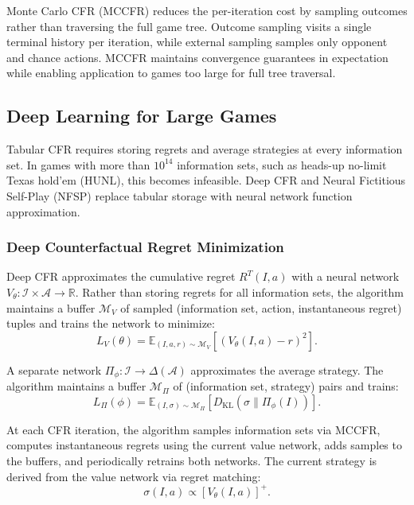 Monte Carlo CFR (MCCFR) \citep{lanctot2009monte} reduces the per-iteration cost by sampling outcomes rather than traversing the full game tree. Outcome sampling visits a single terminal history per iteration, while external sampling samples only opponent and chance actions. MCCFR maintains convergence guarantees in expectation while enabling application to games too large for full tree traversal.

\subsection{Deep Learning for Large Games}

Tabular CFR requires storing regrets and average strategies at every information set. In games with more than $10^{14}$ information sets, such as heads-up no-limit Texas hold'em (HUNL), this becomes infeasible. Deep CFR \citep{Brown2019} and Neural Fictitious Self-Play (NFSP) \citep{heinrich2016deep} replace tabular storage with neural network function approximation.

\subsubsection{Deep Counterfactual Regret Minimization}

Deep CFR approximates the cumulative regret $R^T(I, a)$ with a neural network $V_\theta: \mathcal{I} \times \mathcal{A} \to \mathbb{R}$. Rather than storing regrets for all information sets, the algorithm maintains a buffer $\mathcal{M}_V$ of sampled (information set, action, instantaneous regret) tuples and trains the network to minimize:
\begin{equation}
L_V(\theta) = \mathbb{E}_{(I, a, r) \sim \mathcal{M}_V} \left[ (V_\theta(I, a) - r)^2 \right].
\end{equation}

A separate network $\Pi_\phi: \mathcal{I} \to \Delta(\mathcal{A})$ approximates the average strategy. The algorithm maintains a buffer $\mathcal{M}_\Pi$ of (information set, strategy) pairs and trains:
\begin{equation}
L_\Pi(\phi) = \mathbb{E}_{(I, \sigma) \sim \mathcal{M}_\Pi} \left[ D_{\text{KL}}(\sigma \| \Pi_\phi(I)) \right].
\end{equation}

At each CFR iteration, the algorithm samples information sets via MCCFR, computes instantaneous regrets using the current value network, adds samples to the buffers, and periodically retrains both networks. The current strategy is derived from the value network via regret matching:
\begin{equation}
\sigma(I, a) \propto [V_\theta(I, a)]^+.
\end{equation}

